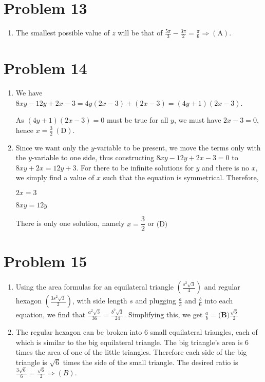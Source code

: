 \documentclass{article}%
\begin{document}
%
\section*{Problem 13}%
\label{sec:Problem13}%
\begin{enumerate}%
\item%
The smallest possible value of $z$ will be that of $\frac{5\pi}{3} - \frac{3\pi}{2} = \frac{\pi}{6} \Rightarrow \mathrm{(A)}$.

%
\end{enumerate}

%
\section*{Problem 14}%
\label{sec:Problem14}%
\begin{enumerate}%
\item%
We have $8xy - 12y + 2x - 3 = 4y(2x - 3) + (2x - 3) = (4y + 1)(2x - 3)$. 

As $(4y + 1)(2x - 3) = 0$ must be true for all $y$, we must have $2x - 3 = 0$, hence $\boxed{x = \frac 32\ \mathrm{ (D)}}$.

%
\item%
Since we want only the $y$-variable to be present, we move the terms only with the $y$-variable to one side, thus constructing $8xy - 12y + 2x - 3 = 0$ to $8xy + 2x = 12y + 3$. For there to be infinite solutions for $y$ and there is no $x$, we simply find a value of $x$ such that the equation is symmetrical. Therefore,

$2x = 3$

$8xy = 12y$

There is only one solution, namely $x = \boxed{\dfrac{3}{2}}$ or $\text{(D)}$

%
\end{enumerate}

%
\section*{Problem 15}%
\label{sec:Problem15}%
\begin{enumerate}%
\item%
Using the area formulas for an equilateral triangle $\left(\frac{{s}^{2}\sqrt{3}}{4}\right)$ and regular hexagon $\left(\frac{3{s}^{2}\sqrt{3}}{2}\right)$, with side length $s$ and plugging $\frac{a}{3}$ and $\frac{b}{6}$ into each equation, we find that $\frac{{a}^{2}\sqrt{3}}{36}=\frac{{b}^{2}\sqrt{3}}{24}$. Simplifying this, we get $\frac{a}{b}=\boxed{\textbf{(B)} \frac{\sqrt{6}}{2}}$

%
\item%
The regular hexagon can be broken into 6 small equilateral triangles, each of which is similar to the big equilateral triangle. The big triangle's area is 6 times the area of one of the little triangles. Therefore each side of the big triangle is $\sqrt{6}$ times the side of the small triangle. The desired ratio is $\frac{3\sqrt{6}}{6}=\frac{\sqrt{6}}{2}\Rightarrow(B).$

%
\end{enumerate}
\end{document}
